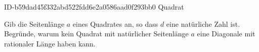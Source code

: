 \begin{exercise}
      {ID-b59dad45f332abd522fdd6e2a0586aad0f293bb0}
      {Quadrat}
  \ifproblem\problem
    \begin{minipage}[c]{0.24\linewidth}
      \centering
    \end{minipage}\hfill
    \begin{minipage}[c]{0.75\linewidth}
      Gib die Seitenlänge $a$ eines Quadrates an, so dass $d$ eine
      natürliche Zahl ist. Begründe, warum kein Quadrat mit natürlicher
      Seitenlänge $a$ eine Diagonale mit rationaler Länge haben kann.
    \end{minipage}
  \fi
\end{exercise}
